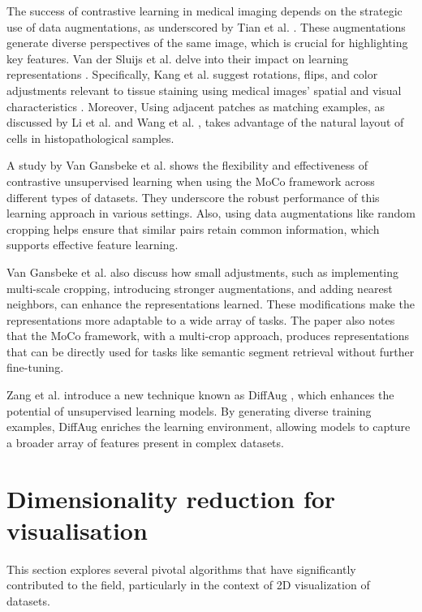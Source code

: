 The success of contrastive learning in medical imaging depends on the strategic use of data augmentations, as underscored by Tian et al. \cite{tian2022understanding}. These augmentations generate diverse perspectives of the same image, which is crucial for highlighting key features. Van der Sluijs et al. delve into their impact on learning representations \cite{van2024exploring}. Specifically, Kang et al. suggest rotations, flips, and color adjustments relevant to tissue staining using medical images' spatial and visual characteristics \cite{kang2023benchmarking}. Moreover, Using adjacent patches as matching examples, as discussed by Li et al. \cite{li2021dual} and Wang et al. \cite{wang2021transpath}, takes advantage of the natural layout of cells in histopathological samples.


A study by Van Gansbeke et al. \cite{van2021revisiting} shows the flexibility and effectiveness of contrastive unsupervised learning when using the MoCo framework across different types of datasets. They underscore the robust performance of this learning approach in various settings. Also, using data augmentations like random cropping helps ensure that similar pairs retain common information, which supports effective feature learning.

Van Gansbeke et al. also discuss how small adjustments, such as implementing multi-scale cropping, introducing stronger augmentations, and adding nearest neighbors, can enhance the representations learned. These modifications make the representations more adaptable to a wide array of tasks. The paper also notes that the MoCo framework, with a multi-crop approach, produces representations that can be directly used for tasks like semantic segment retrieval without further fine-tuning.

Zang et al. introduce a new technique known as DiffAug \cite{zang2023boosting}, which enhances the potential of unsupervised learning models. By generating diverse training examples, DiffAug enriches the learning environment, allowing models to capture a broader array of features present in complex datasets.

\section{Dimensionality reduction for visualisation}

This section explores several pivotal algorithms that have significantly contributed to the field, particularly in the context of 2D visualization of datasets.

